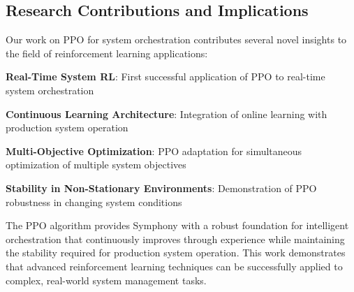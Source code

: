\subsection*{Research Contributions and Implications}

Our work on PPO for system orchestration contributes several novel insights to the field of reinforcement learning applications:

\begin{expandedlist}
    \item \textbf{Real-Time System RL}: First successful application of PPO to real-time system orchestration
    \item \textbf{Continuous Learning Architecture}: Integration of online learning with production system operation
    \item \textbf{Multi-Objective Optimization}: PPO adaptation for simultaneous optimization of multiple system objectives
    \item \textbf{Stability in Non-Stationary Environments}: Demonstration of PPO robustness in changing system conditions
\end{expandedlist}

The PPO algorithm provides Symphony with a robust foundation for intelligent orchestration that continuously improves through experience while maintaining the stability required for production system operation. This work demonstrates that advanced reinforcement learning techniques can be successfully applied to complex, real-world system management tasks.
